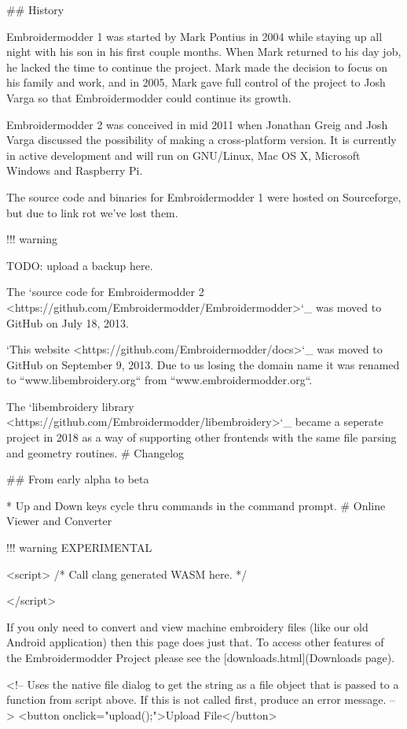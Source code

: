 ## History

Embroidermodder 1 was started by Mark Pontius in 2004 while staying up all night
with his son in his first couple months. When Mark returned to his day job, he
lacked the time to continue the project. Mark made the decision to focus on his
family and work, and in 2005, Mark gave full control of the project to Josh Varga
so that Embroidermodder could continue its growth.

Embroidermodder 2 was conceived in mid 2011 when Jonathan Greig and Josh Varga
discussed the possibility of making a cross-platform version. It is currently in
active development and will run on GNU/Linux, Mac OS X, Microsoft Windows and
Raspberry Pi.

The source code and binaries for Embroidermodder 1 were hosted on Sourceforge, but
due to link rot we've lost them.

!!! warning

    TODO: upload a backup here.

The `source code for Embroidermodder 2 <https://github.com/Embroidermodder/Embroidermodder>`_
was moved to GitHub on July 18, 2013.

`This website <https://github.com/Embroidermodder/docs>`_ was moved
to GitHub on September 9, 2013. Due to us losing the domain name it was renamed
to ``www.libembroidery.org`` from ``www.embroidermodder.org``.

The `libembroidery library <https://github.com/Embroidermodder/libembroidery>`_
became a seperate project in 2018 as a way of supporting other frontends with
the same file parsing and geometry routines.
# Changelog

## From early alpha to beta

* Up and Down keys cycle thru commands in the command prompt.
# Online Viewer and Converter

!!! warning
    EXPERIMENTAL

<script>
  /* Call clang generated WASM here. */
  
</script>

If you only need to convert and view machine embroidery files (like our old Android application) then this page
does just that. To access other features of the Embroidermodder Project please see the [downloads.html](Downloads page).

<!-- Uses the native file dialog to get the string as a file object that is passed to a function from script above.
     If this is not called first, produce an error message. -->
<button onclick="upload();">Upload File</button>

